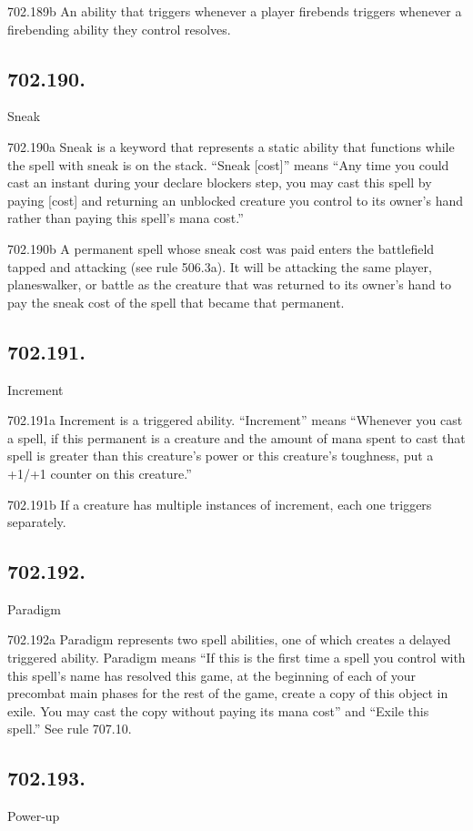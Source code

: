 702.189b An ability that triggers whenever a player firebends triggers whenever a firebending ability they control resolves.

\subsection*{702.190.}
Sneak

702.190a Sneak is a keyword that represents a static ability that functions while the spell with sneak is on the stack. “Sneak [cost]” means “Any time you could cast an instant during your declare blockers step, you may cast this spell by paying [cost] and returning an unblocked creature you control to its owner’s hand rather than paying this spell’s mana cost.”

702.190b A permanent spell whose sneak cost was paid enters the battlefield tapped and attacking (see rule 506.3a). It will be attacking the same player, planeswalker, or battle as the creature that was returned to its owner’s hand to pay the sneak cost of the spell that became that permanent.

\subsection*{702.191.}
Increment

702.191a Increment is a triggered ability. “Increment” means “Whenever you cast a spell, if this permanent is a creature and the amount of mana spent to cast that spell is greater than this creature’s power or this creature’s toughness, put a +1/+1 counter on this creature.”

702.191b If a creature has multiple instances of increment, each one triggers separately.

\subsection*{702.192.}
Paradigm

702.192a Paradigm represents two spell abilities, one of which creates a delayed triggered ability. Paradigm means “If this is the first time a spell you control with this spell’s name has resolved this game, at the beginning of each of your precombat main phases for the rest of the game, create a copy of this object in exile. You may cast the copy without paying its mana cost” and “Exile this spell.” See rule 707.10.

\subsection*{702.193.}
Power-up

